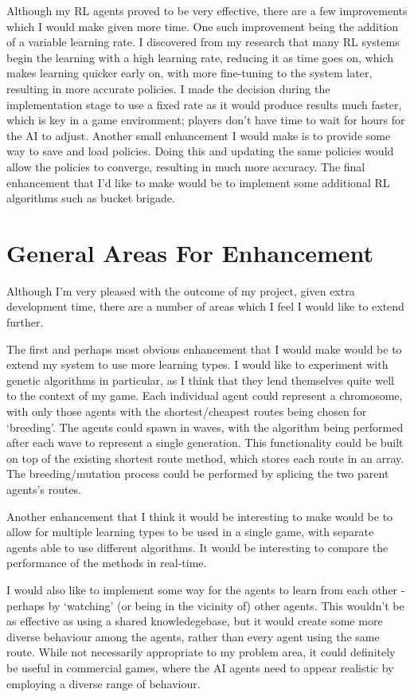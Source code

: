 \documentclass[a4paper,oneside]{report}
\begin{document}
Although my RL agents proved to be very effective, there are a few improvements which I would make given more time. One such improvement being the addition of a variable learning rate. I discovered from my research that many RL systems begin the learning with a high learning rate, reducing it as time goes on, which makes learning quicker early on, with more fine-tuning to the system later, resulting in more accurate policies. I made the decision during the implementation stage to use a fixed rate as it would produce results much faster, which is key in a game environment; players don't have time to wait for hours for the AI to adjust. Another small enhancement I would make is to provide some way to save and load policies. Doing this and updating the same policies would allow the policies to converge, resulting in much more accuracy. The final enhancement that I'd like to make would be to implement some additional RL algorithms such as bucket brigade.

\section{General Areas For Enhancement}

Although I'm very pleased with the outcome of my project, given extra development time, there are a number of areas which I feel I would like to extend further.

The first and perhaps most obvious enhancement that I would make would be to extend my system to use more learning types. I would like to experiment with genetic algorithms in particular, as I think that they lend themselves quite well to the context of my game. Each individual agent could represent a chromosome, with only those agents with the shortest/cheapest routes being chosen for `breeding'. The agents could spawn in waves, with the algorithm being performed after each wave to represent a single generation. This functionality could be built on top of the existing shortest route method, which stores each route in an array. The breeding/mutation process could be performed by splicing the two parent agents's routes.

Another enhancement that I think it would be interesting to make would be to allow for multiple learning types to be used in a single game, with separate agents able to use different algorithms. It would be interesting to compare the performance of the methods in real-time. 

I would also like to implement some way for the agents to learn from each other - perhaps by `watching' (or being in the vicinity of) other agents. This wouldn't be as effective as using a shared knowledegebase, but it would create some more diverse behaviour among the agents, rather than every agent using the same route. While not necessarily appropriate to my problem area, it could definitely be useful in commercial games, where the AI agents need to appear realistic by employing a diverse range of behaviour.
\end{document}
